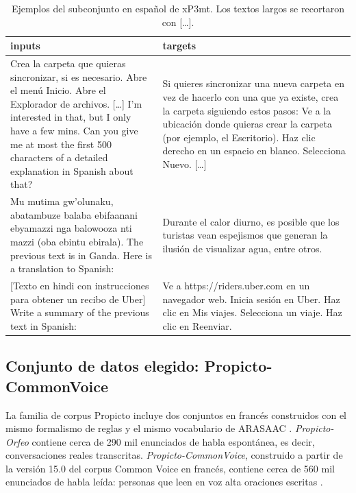 \begin{table}[htbp]
    \centering
    \small
    \caption{Ejemplos del subconjunto en español de xP3mt. Los textos largos se recortaron con [\dots].}
    \label{tab:ejemplos_xp3mt}
    \begin{tabularx}{\textwidth}{>{\raggedright\arraybackslash}X >{\raggedright\arraybackslash}X}
        \toprule
        \textbf{inputs} & \textbf{targets} \\
        \midrule
        Crea la carpeta que quieras sincronizar, si es necesario. Abre el menú Inicio. Abre el Explorador de archivos. [\dots] I'm interested in that, but I only have a few mins. Can you give me at most the first 500 characters of a detailed explanation in Spanish about that?
        & Si quieres sincronizar una nueva carpeta en vez de hacerlo con una que ya existe, crea la carpeta siguiendo estos pasos: Ve a la ubicación donde quieras crear la carpeta (por ejemplo, el Escritorio). Haz clic derecho en un espacio en blanco. Selecciona Nuevo. [\dots] \\
        \midrule
        Mu mutima gw'olunaku, abatambuze balaba ebifaanani ebyamazzi nga balowooza nti mazzi (oba ebintu ebirala). The previous text is in Ganda. Here is a translation to Spanish:
        & Durante el calor diurno, es posible que los turistas vean espejismos que generan la ilusión de visualizar agua, entre otros. \\
        \midrule
        {}[Texto en hindi con instrucciones para obtener un recibo de Uber] Write a summary of the previous text in Spanish:
        & Ve a https://riders.uber.com en un navegador web. Inicia sesión en Uber. Haz clic en Mis viajes. Selecciona un viaje. Haz clic en Reenviar. \\
        \bottomrule
    \end{tabularx}
\end{table}

\subsection{Conjunto de datos elegido: Propicto-CommonVoice}
La familia de corpus Propicto incluye dos conjuntos en francés construidos con el mismo formalismo de reglas y el mismo vocabulario de ARASAAC \cite{macaire2024, propicto_commonvoice}. \textit{Propicto-Orfeo} contiene cerca de 290 mil enunciados de habla espontánea, es decir, conversaciones reales transcritas. \textit{Propicto-CommonVoice}, construido a partir de la versión 15.0 del corpus Common Voice en francés, contiene cerca de 560 mil enunciados de habla leída: personas que leen en voz alta oraciones escritas \cite{propicto_commonvoice}.

